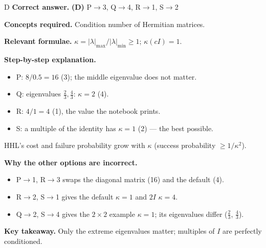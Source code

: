 \documentclass[11pt,a4paper]{article}
\newcommand{\qsep}{\par\vspace{2pt}{\color{black!15}\hrule}\vspace{4pt}}
\begin{document}
\begin{solbox}{D}
\textbf{\color{brand}Correct answer.} \textcolor{okgreen}{\textbf{(D)}} P$\to$3, Q$\to$4, R$\to$1, S$\to$2

\textbf{\color{brand}Concepts required.} Condition number of Hermitian matrices.

\textbf{\color{brand}Relevant formulae.} $\kappa = |\lambda|_{\max}/|\lambda|_{\min} \ge 1$; $\kappa(cI) = 1$.

\textbf{\color{brand}Step-by-step explanation.} \begin{itemize}\itemsep0pt
\item P: $8/0.5 = 16$ (3); the middle eigenvalue does not matter.
\item Q: eigenvalues $\tfrac23, \tfrac43$: $\kappa = 2$ (4).
\item R: $4/1 = 4$ (1), the value the notebook prints.
\item S: a multiple of the identity has $\kappa = 1$ (2) --- the best possible.
\end{itemize}
HHL's cost and failure probability grow with $\kappa$ (success probability $\ge 1/\kappa^2$).

\textbf{\color{brand}Why the other options are incorrect.}
\begin{itemize}[leftmargin=2.4em, itemsep=1pt, topsep=2pt]
\item[\textbf{(A)}] P$\to$1, R$\to$3 swaps the diagonal matrix (16) and the default (4).
\item[\textbf{(B)}] R$\to$2, S$\to$1 gives the default $\kappa = 1$ and $2I$ $\kappa = 4$.
\item[\textbf{(C)}] Q$\to$2, S$\to$4 gives the $2\times2$ example $\kappa = 1$; its eigenvalues differ ($\frac23$, $\frac43$).
\end{itemize}
\textbf{\color{brand}Key takeaway.} Only the extreme eigenvalues matter; multiples of $I$ are perfectly conditioned.
\end{solbox}
\qsep
\end{document}
